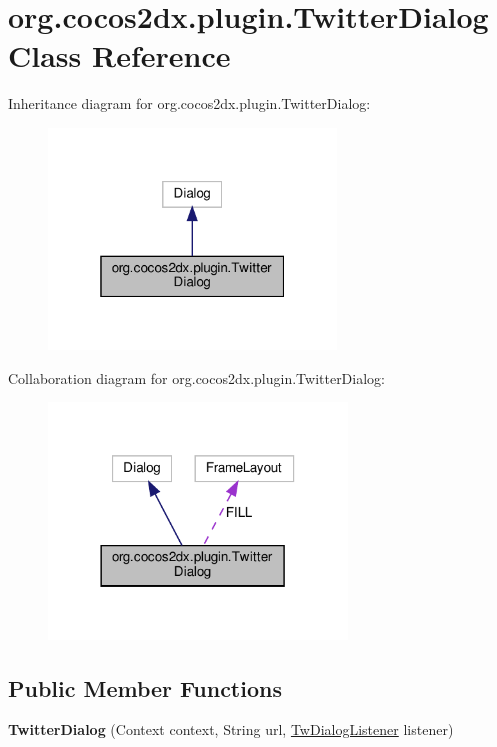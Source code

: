\hypertarget{classorg_1_1cocos2dx_1_1plugin_1_1TwitterDialog}{}\section{org.\+cocos2dx.\+plugin.\+Twitter\+Dialog Class Reference}
\label{classorg_1_1cocos2dx_1_1plugin_1_1TwitterDialog}


Inheritance diagram for org.\+cocos2dx.\+plugin.\+Twitter\+Dialog\+:
\nopagebreak
\begin{figure}[H]
\begin{center}
\leavevmode
\includegraphics[width=217pt]{classorg_1_1cocos2dx_1_1plugin_1_1TwitterDialog__inherit__graph}
\end{center}
\end{figure}


Collaboration diagram for org.\+cocos2dx.\+plugin.\+Twitter\+Dialog\+:
\nopagebreak
\begin{figure}[H]
\begin{center}
\leavevmode
\includegraphics[width=225pt]{classorg_1_1cocos2dx_1_1plugin_1_1TwitterDialog__coll__graph}
\end{center}
\end{figure}
\subsection*{Public Member Functions}
\begin{DoxyCompactItemize}
\item 
\mbox{\label{classorg_1_1cocos2dx_1_1plugin_1_1TwitterDialog_aa4237551b041363aa04b084aa66b86c2}} 
{\bfseries Twitter\+Dialog} (Context context, String url, \hyperlink{interfaceorg_1_1cocos2dx_1_1plugin_1_1TwitterApp_1_1TwDialogListener}{Tw\+Dialog\+Listener} listener)
\end{DoxyCompactItemize}
